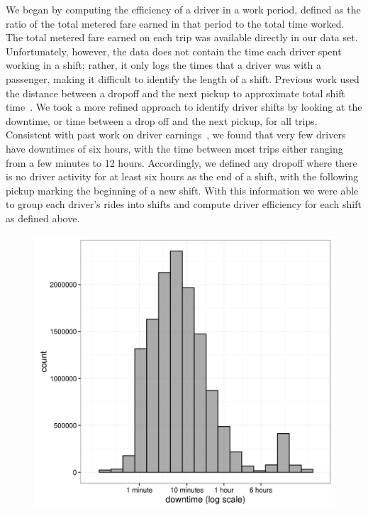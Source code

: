 \documentclass[twocolumn]{article}
\begin{document}
We began by computing the efficiency of a driver in a work period, defined as the ratio of the total metered fare earned in that period to the total time worked. The total metered fare earned on each trip was available directly in our data set. Unfortunately, however, the data does not contain the time each driver spent working in a shift; rather, it only logs the times that a driver was with a passenger, making it difficult to identify the length of a shift. Previous work used the distance between a dropoff and the next pickup to approximate total shift time~\cite{LEE:2015}. We took a more refined approach to identify driver shifts by looking at the downtime, or time between a drop off and the next pickup, for all trips.
Consistent with past work on driver earnings~\cite{Farber:2014}, we found that very few drivers have downtimes of six hours, with the time between most trips either ranging from a few minutes to 12 hours.
Accordingly, we defined any dropoff where there is no driver activity for at least six hours as the end of a shift, with the following pickup marking the beginning of a new shift.
With this information we were able to group each driver's rides into shifts and compute driver efficiency for each shift as defined above.


\begin{figure}[t]
  \centering
  \includegraphics[width=.9\linewidth]{downtime_distribution}
  \label{fig:downtime_distribution}
\end{figure}
\end{document}
